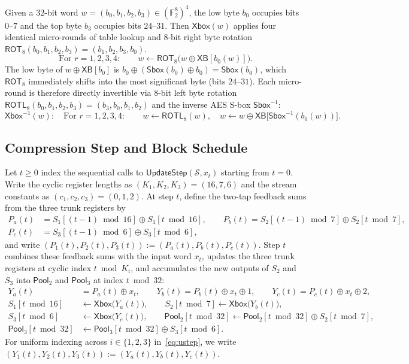 \documentclass[11pt,a4paper]{article}
\theoremstyle{definition}
\theoremstyle{remark}
\newcommand{\Ftwo}{\mathbb{F}_2}
\newcommand{\Xbox}{\mathsf{Xbox}}
\newcommand{\Sbox}{\mathsf{Sbox}}
\newcommand{\ROT}{\mathsf{ROT}_8}
\newcommand{\ROTL}{\mathsf{ROTL}_8}
\newcommand{\UpdateStep}{\mathsf{UpdateStep}}
\newcommand{\Pool}{\mathsf{Pool}}
\begin{document}
Given a $32$-bit word $w = (b_0, b_1, b_2, b_3) \in (\Ftwo^8)^4$, the low byte $b_0$ occupies bits $0\text{--}7$ and the top byte $b_3$ occupies bits $24\text{--}31$. Then $\Xbox(w)$ applies four identical micro-rounds of table lookup and $8$-bit right byte rotation $\ROT(b_0, b_1, b_2, b_3) = (b_1, b_2, b_3, b_0)$.
\begin{equation}
\label{eq:xbox-def}
\text{For } r = 1, 2, 3, 4: \qquad w \leftarrow \ROT\big(w \oplus \mathsf{XB}[b_0(w)]\big).
\end{equation}
The low byte of $w \oplus \mathsf{XB}[b_0]$ is $b_0 \oplus (\Sbox(b_0) \oplus b_0) = \Sbox(b_0)$, which $\ROT$ immediately shifts into the most significant byte (bits $24\text{--}31$). Each micro-round is therefore directly invertible via $8$-bit left byte rotation $\ROTL(b_0, b_1, b_2, b_3) = (b_3, b_0, b_1, b_2)$ and the inverse AES S-box $\Sbox^{-1}$:
\[
\Xbox^{-1}(w): \quad \text{For } r = 1, 2, 3, 4: \qquad w \leftarrow \ROTL(w), \quad w \leftarrow w \oplus \mathsf{XB}\big[\Sbox^{-1}(b_0(w))\big].
\]

\subsection{Compression Step and Block Schedule}
\label{subsec:update-step}
Let $t \ge 0$ index the sequential calls to $\UpdateStep(\mathcal{S}, x_t)$ starting from $t = 0$. Write the cyclic register lengths as $(K_1, K_2, K_3) = (16, 7, 6)$ and the stream constants as $(c_1, c_2, c_3) = (0, 1, 2)$. At step $t$, define the two-tap feedback sums from the three trunk registers by
\begin{equation}
\label{eq:PaPbPc}
\begin{aligned}
P_a(t) &= S_1[(t-1)\bmod 16] \oplus S_1[t\bmod 16], \qquad
P_b(t) = S_2[(t-1)\bmod 7]  \oplus S_2[t\bmod 7], \\
P_c(t) &= S_3[(t-1)\bmod 6]  \oplus S_3[t\bmod 6],
\end{aligned}
\end{equation}
and write $(P_1(t), P_2(t), P_3(t)) := (P_a(t), P_b(t), P_c(t))$. Step $t$ combines these feedback sums with the input word $x_t$, updates the three trunk registers at cyclic index $t \bmod K_i$, and accumulates the new outputs of $S_2$ and $S_3$ into $\Pool_2$ and $\Pool_3$ at index $t \bmod 32$:
\begin{equation}
\label{eq:ustep}
\begin{aligned}
Y_a(t) &= P_a(t) \oplus x_t, \qquad
Y_b(t) = P_b(t) \oplus x_t \oplus 1, \qquad
Y_c(t) = P_c(t) \oplus x_t \oplus 2, \\
S_1[t \bmod 16] &\leftarrow \Xbox\big(Y_a(t)\big), \qquad
S_2[t \bmod 7]  \leftarrow \Xbox\big(Y_b(t)\big), \\
S_3[t \bmod 6]  &\leftarrow \Xbox\big(Y_c(t)\big), \qquad
\Pool_2[t \bmod 32] \leftarrow \Pool_2[t \bmod 32] \oplus S_2[t \bmod 7], \\
\Pool_3[t \bmod 32] &\leftarrow \Pool_3[t \bmod 32] \oplus S_3[t \bmod 6].
\end{aligned}
\end{equation}
For uniform indexing across $i \in \{1, 2, 3\}$ in~\eqref{eq:ustep}, we write $(Y_1(t), Y_2(t), Y_3(t)) := (Y_a(t), Y_b(t), Y_c(t))$.
\end{document}
